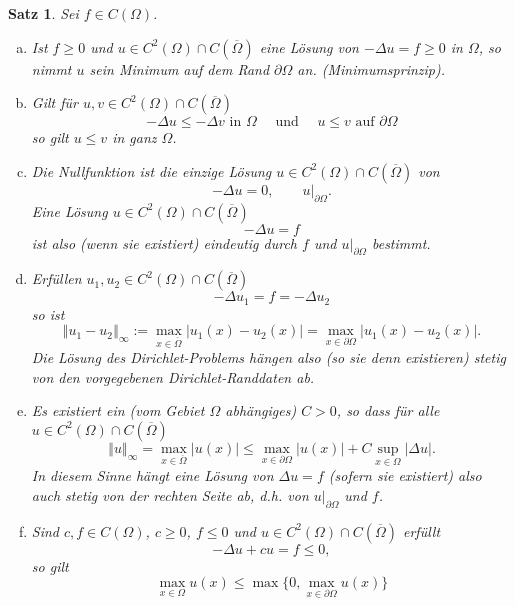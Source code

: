 \documentclass[
]{mycourse}
\theoremstyle{mythm}
\newtheorem{theorem}{Satz}[chapter]
\theoremstyle{break}
\newcommand{\norm}[1]{\left\Vert#1\right\Vert}		%
\begin{document}
\begin{theorem}\label{thm:MaxPrinzipFolgerungen}
Sei $f\in C(\Omega)$. 
\begin{enumerate}[(a)]
\item Ist $f\geq 0$ und $u\in C^2(\Omega)\cap C(\overline\Omega)$ eine Lösung von 
$-\Delta u=f\geq 0$ in $\Omega$, so nimmt $u$ sein Minimum auf dem
Rand $\partial \Omega$ an. (\emph{Minimumsprinzip}).
%
\item Gilt für $u,v\in C^2(\Omega)\cap C(\overline\Omega)$
\[
-\Delta u\leq -\Delta v \mbox{ in $\Omega$} \quad \mbox{ und } \quad u\leq v \mbox{ auf $\partial \Omega$}
\]
so gilt $u\leq v$ in ganz $\Omega$.
%
\item Die Nullfunktion ist die einzige Lösung $u\in C^2(\Omega)\cap C(\overline\Omega)$ von \[
-\Delta u=0, \qquad u|_{\partial \Omega}.
\]
Eine Lösung $u\in C^2(\Omega)\cap C(\overline\Omega)$ 
\[
-\Delta u=f
\]
ist also (wenn sie existiert) eindeutig durch $f$ und $u|_{\partial \Omega}$ bestimmt.
%
\item Erfüllen $u_1,u_2\in C^2(\Omega)\cap C(\overline\Omega)$ 
\[
-\Delta u_1=f= -\Delta u_2
\]
so ist 
\[
\norm{u_1-u_2}_\infty:=\max_{x\in \overline{\Omega}}|u_1(x)-u_2(x)|=\max_{x\in \partial \Omega}|u_1(x)-u_2(x)|.
\]
Die Lösung des Dirichlet-Problems hängen also (so sie denn existieren) stetig von den vorgegebenen Dirichlet-Randdaten ab.
%
\item Es existiert ein (vom Gebiet $\Omega$ abhängiges) $C>0$, so dass für alle $u\in C^2(\Omega)\cap C(\overline\Omega)$ 
\[
\norm{u}_\infty=\max_{x\in \overline\Omega} |u(x)|\leq \max_{x\in \partial \Omega} |u(x)|+C\sup_{x\in \Omega} |\Delta u|.
\]
In diesem Sinne hängt eine Lösung von $\Delta u=f$ (sofern sie existiert) also auch stetig von der rechten Seite ab, d.h. von $u\big|_{\partial \Omega}$ und $f$.
%
\item Sind $c,f\in C(\Omega)$, $c\geq 0$, $f\leq 0$ und $u\in C^2(\Omega)\cap C(\overline\Omega)$ erfüllt
\[
-\Delta u + cu =f \leq 0,
\]
so gilt
\[
\max_{x\in \Omega}{u(x)} \leq \max\{0,\max_{x\in \partial \Omega}{u(x)}\}
\]

\end{enumerate}
\end{theorem}
\end{document}
